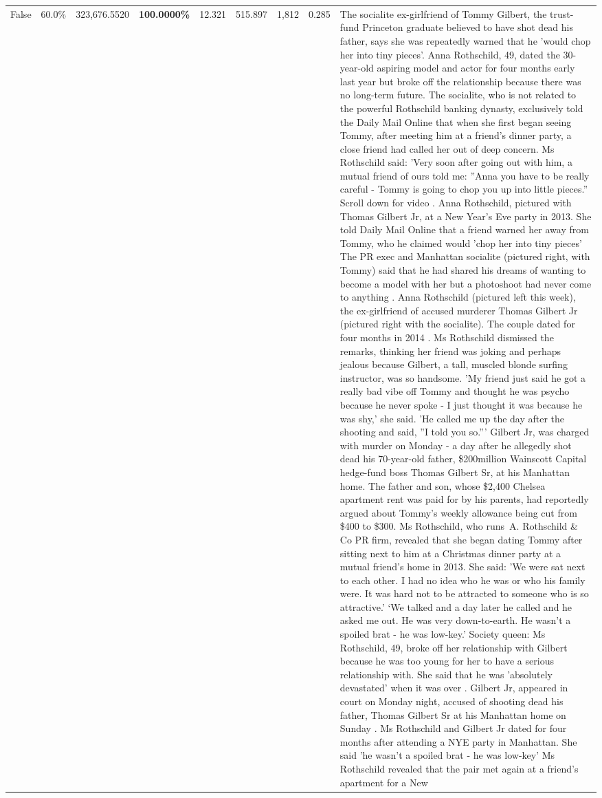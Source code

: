 \begin{table}[H]
\begin{tabular}{lllrlllll}
False & 60.0\% & 323,676.5520 & \bfseries \color{red} 100.0000\% & 12.321 & 515.897 & 1,812 & 0.285 & The socialite ex-girlfriend of Tommy Gilbert, the trust-fund Princeton graduate believed to have shot dead his father, says she was repeatedly warned that he 'would chop her into tiny pieces'. Anna Rothschild, 49, dated the 30-year-old aspiring model and actor for four months early last year but broke off the relationship because there was no long-term future. The socialite, who is not related to the powerful Rothschild banking dynasty, exclusively told the Daily Mail Online that when she first began seeing Tommy, after meeting him at a friend's dinner party, a close friend had called her out of deep concern. Ms Rothschild said: 'Very soon after going out with him, a mutual friend of ours told me: ''Anna you have to be really careful - Tommy is going to chop you up into little pieces.'' Scroll down for video . Anna Rothschild, pictured with Thomas Gilbert Jr, at a New Year's Eve party in 2013. She told Daily Mail Online that a friend warned her away from Tommy, who he claimed would 'chop her into tiny pieces' The PR exec and Manhattan socialite (pictured right, with Tommy) said that he had shared his dreams of wanting to become a model with her but a photoshoot had never come to anything . Anna Rothschild (pictured left this week), the ex-girlfriend of accused murderer Thomas Gilbert Jr (pictured right with the socialite). The couple dated for four months in 2014 . Ms Rothschild dismissed the remarks, thinking her friend was joking and perhaps jealous because Gilbert, a tall, muscled blonde surfing instructor, was so handsome. 'My friend just said he got a really bad vibe off Tommy and thought he was psycho because he never spoke - I just thought it was because he was shy,' she said. 'He called me up the day after the shooting and said, ''I told you so.''' Gilbert Jr, was charged with murder on Monday - a day after he allegedly shot dead his 70-year-old father, \$200million Wainscott Capital hedge-fund boss Thomas Gilbert Sr, at his Manhattan home. The father and son, whose \$2,400 Chelsea apartment rent was paid for by his parents, had reportedly argued about Tommy's weekly allowance being cut from \$400 to \$300. Ms Rothschild, who runs A. Rothschild \& Co PR firm, revealed that she began dating Tommy after sitting next to him at a Christmas dinner party at a mutual friend's home in 2013. She said: 'We were sat next to each other. I had no idea who he was or who his family were. It was hard not to be attracted to someone who is so attractive.' ‘We talked and a day later he called and he asked me out. He was very down-to-earth. He wasn’t a spoiled brat - he was low-key.’ Society queen: Ms Rothschild, 49, broke off her relationship with Gilbert because he was too young for her to have a serious relationship with. She said that he was 'absolutely devastated' when it was over . Gilbert Jr, appeared in court on Monday night, accused of shooting dead his father, Thomas Gilbert Sr at his Manhattan home on Sunday . Ms Rothschild and Gilbert Jr dated for four months after attending a NYE party in Manhattan. She said 'he wasn't a spoiled brat - he was low-key' Ms Rothschild revealed that the pair met again at a friend’s apartment for a New 
\end{tabular}
\end{table}
